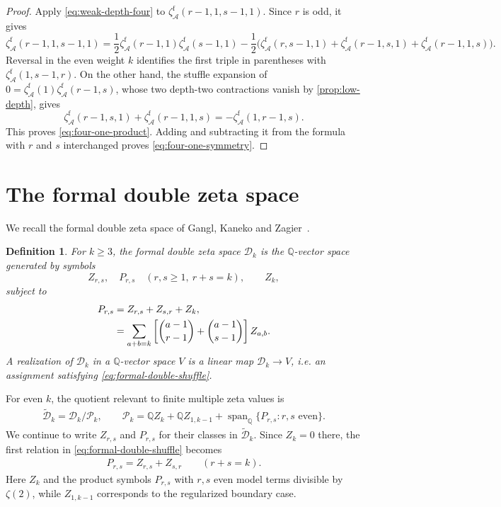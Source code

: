 \documentclass[12pt]{amsart}
\numberwithin{equation}{section}
\theoremstyle{plain}
\newtheorem{dfn}[dfn]{Definition}
\newcommand{\QQ}{\mathbb{Q}}
\DeclareMathOperator{\Span}{span}
\newcommand{\zaf}[1]{\zeta_{\mathcal A}^{\mathrm f}(#1)}
\newcommand{\Dk}{\mathcal D_k}
\newcommand{\Dtk}{\widetilde{\mathcal D}_k}
\begin{document}
\begin{proof}
Apply \eqref{eq:weak-depth-four} to
$\zaf{r-1,1,s-1,1}$. Since $r$ is odd, it gives
\[
 \zaf{r-1,1,s-1,1}
 =\frac12\zaf{r-1,1}\zaf{s-1,1}
 -\frac12\bigl(
 \zaf{r,s-1,1}+\zaf{r-1,s,1}+\zaf{r-1,1,s}\bigr).
\]
Reversal in the even weight $k$ identifies the first triple in
parentheses with $\zaf{1,s-1,r}$. On the other hand, the stuffle
expansion of $0=\zaf1\zaf{r-1,s}$, whose two depth-two contractions
vanish by \cref{prop:low-depth}, gives
\[
 \zaf{r-1,s,1}+\zaf{r-1,1,s}=-\zaf{1,r-1,s}.
\]
This proves \eqref{eq:four-one-product}. Adding and subtracting it from the
formula with $r$ and $s$ interchanged proves
\eqref{eq:four-one-symmetry}.
\end{proof}

\section{The formal double zeta space}\label{sec:double-zeta}

We recall the formal double zeta space of Gangl, Kaneko and
Zagier~\cite{GKZ}.

\begin{dfn}\label{def:double-zeta}
For $k\geq3$, the \emph{formal double zeta space} $\Dk$ is the $\QQ$-vector space generated by symbols
\[
 Z_{r,s},\quad P_{r,s}\quad(r,s\geq1,\ r+s=k),
 \qquad Z_k,
\]
subject to
\begin{align}\label{eq:formal-double-shuffle}
 P_{r,s}
 &=Z_{r,s}+Z_{s,r}+Z_k,\\
 &=\sum_{a+b=k}\left[\binom{a-1}{r-1}+\binom{a-1}{s-1}\right]Z_{a,b}.\notag
\end{align}
A realization of $\Dk$ in a $\QQ$-vector space $V$ is a linear map $\Dk\to V$, i.e. an assignment satisfying \eqref{eq:formal-double-shuffle}.
\end{dfn}

For even $k$, the quotient relevant to finite multiple zeta values is
\begin{align}\label{eq:reduced-double-zeta}
 \Dtk=\Dk/\mathcal P_k,
 \qquad
 \mathcal P_k=\QQ Z_k+\QQ Z_{1,k-1}
 +\Span_{\QQ}\{P_{r,s}:r,s\text{ even}\}.
\end{align}
We continue to write $Z_{r,s}$ and $P_{r,s}$ for their classes in
$\Dtk$. Since $Z_k=0$ there, the first relation in
\eqref{eq:formal-double-shuffle} becomes
\begin{align}\label{eq:product-in-Dtilde}
 P_{r,s}=Z_{r,s}+Z_{s,r}\qquad(r+s=k).
\end{align}
Here $Z_k$ and the product symbols $P_{r,s}$ with $r,s$ even model terms
divisible by $\zeta(2)$, while $Z_{1,k-1}$ corresponds to the regularized
boundary case.
\end{document}
